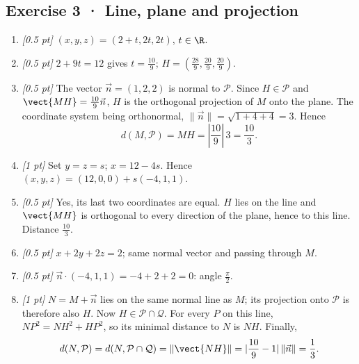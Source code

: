 \subsection*{Exercise 3 · Line, plane and projection}\begin{enumerate}

\item \textit{[0.5 pt]} $(x,y,z)=(2+t,2t,2t)$, $t\in\R$.

\item \textit{[0.5 pt]} $2+9t=12$ gives $t=\frac{10}{9}$; $H=(\frac{28}{9},\frac{20}{9},\frac{20}{9})$.

\item \textit{[0.5 pt]} The vector $\vec n=(1,2,2)$ is normal to $\mathcal P$. Since $H\in\mathcal P$ and $\vect{MH}=\frac{10}{9}\vec n$, $H$ is the orthogonal projection of $M$ onto the plane. The coordinate system being orthonormal, $\|\vec n\|=\sqrt{1+4+4}=3$. Hence
\[d(M,\mathcal P)=MH=|\frac{10}{9}|\,3=\frac{10}{3}.\]

\item \textit{[1 pt]} Set $y=z=s$; $x=12-4s$. Hence $(x,y,z)=(12,0,0)+s(-4,1,1)$.

\item \textit{[0.5 pt]} Yes, its last two coordinates are equal. $H$ lies on the line and $\vect{MH}$ is orthogonal to every direction of the plane, hence to this line. Distance $\frac{10}{3}$.

\item \textit{[0.5 pt]} $x+2y+2z=2$; same normal vector and passing through $M$.

\item \textit{[0.5 pt]} $\vec n\cdot(-4,1,1)=-4+2+2=0$: angle $\frac{\pi}{2}$.

\item \textit{[1 pt]} $N=M+\vec n$ lies on the same normal line as $M$; its projection onto $\mathcal P$ is therefore also $H$. Now $H\in\mathcal P\cap\mathcal Q$. For every $P$ on this line, $NP^2=NH^2+HP^2$, so its minimal distance to $N$ is $NH$. Finally,
\[d(N,\mathcal P)=d(N,\mathcal P\cap\mathcal Q)=\|\vect{NH}\|=|\frac{10}{9}-1|\,\|\vec n\|=\frac{1}{3}.\]

\end{enumerate}

